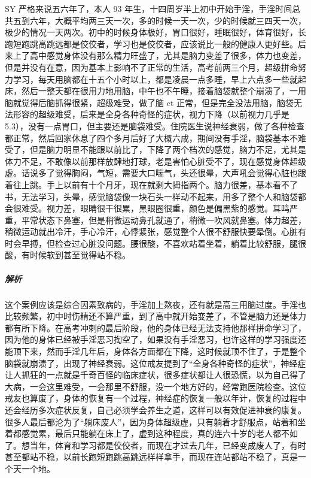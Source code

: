 \begin{case}[神经衰弱]
    SY 严格来说五六年了，本人 93 年生，十四周岁半上初中开始手淫，手淫时间总共五到六年，大概平均两三天一次，多的时候一天一次，少的时候就三四天一次，极少的情况一天两次。初中的时候身体极好，胃口很好，睡眠很好，体育很好，长跑短跑跳高跳远都是佼佼者，学习也是佼佼者，应该说比一般的健康人更好些。后来上了高中感觉身体没有那么精力旺盛了，尤其是脑力变差了很多，体力也变差，但是并没有在意，因为基本上影响不了正常的生活，高考前两三个月，超级拼命努力学习，每天用脑都在十五个小时以上，都是凌晨一点多睡，早上六点多一些就起床，然后一整天都在很用力地用脑，中午也不午睡，接着脑袋就整个崩溃了，一用脑就觉得后脑抓得很紧，超级难受，做了脑 ct 正常，但是完全没法用脑，脑袋无法形容的超级难受，后来是全身各种奇怪的症状，视力下降（以前视力几乎是 5.3），没有一点胃口，但主要还是脑袋难受。住院医生说神经衰弱，做了各种检查都正常，然后回家休息了四个多月后好了大概六成，期间没有手淫，脑袋基本不难受了，但是脑力明显不能跟以前比了，下降了两个档次的感觉，脑力不足，尤其是体力不足，不敢像以前那样放肆地打球，老是害怕心脏受不了，现在感觉身体超级虚。话说多了觉得胸闷，气短，需要大口喘气，头还很晕，大声吼会觉得心脏也跟着往上跳。手上以前有十个月牙，现在就剩大拇指两个。脑力很差，基本看不了书，无法学习，头晕，感觉脑袋像一块石头一样动不起来，用多了整个人和脑袋都会很难受。视力差，眼睛很干很累，黑眼圈很重，颜色是偏黑紫的感觉。耳鸣严重，平常状态下鼻塞，但是稍微运动鼻孔就通了，稍微一吹风就鼻塞。体力超差，稍微运动就出冷汗，手心冷汗，心悸紧张，感觉整个人很不舒服快要晕倒。心脏有时会早搏，但检查过心脏没问题。腰很酸，不喜欢站着坐着，躺着比较舒服，腿很酸，有时候软到甚至觉得站不稳。
    \subparagraph{解析} 这个案例应该是综合因素致病的，手淫加上熬夜，还有就是高三用脑过度。手淫也比较频繁，初中时伤精还不算严重，到了高中就开始变差了，不管是脑力还是体力都有所下降。在高考冲刺的最后阶段，他的身体已经无法支持他那样拼命学习了，因为他的身体已经被手淫恶习掏空了，如果没有手淫恶习，也许这样的学习强度还能顶下来，然而手淫几年后，身体各方面都在下降，这时候就顶不住了，于是整个脑袋就崩溃了，出现了神经衰弱。这位戒友提到了“全身各种奇怪的症状”，神经症让人抓狂的一点就是千奇百怪的临床症状，很多症状都让人很恐慌，以为自己得了大病，一会这里难受，一会那里不舒服，没一个地方好的，经常跑医院检查。这位戒友也算废了，身体的恢复有一个过程，神经症的恢复一般以年计，恢复的过程中还会经历多次症状反复，自己必须学会养生之道，这样可以有效促进神衰的康复。很多人最后都沦为了“躺床废人”，因为身体超级虚，只有躺着才舒服点，站着和坐着都感觉累，最后只能躺在床上了，虚到这种程度，真的连六十岁的老人都不如了。想当年，体育和学习都是佼佼者，而现在才过去几年，已经变成废人了，有时甚至都站不稳，以前长跑短跑跳高跳远样样拿手，而现在连站都站不稳了，真是一个天一个地。
\end{case}

